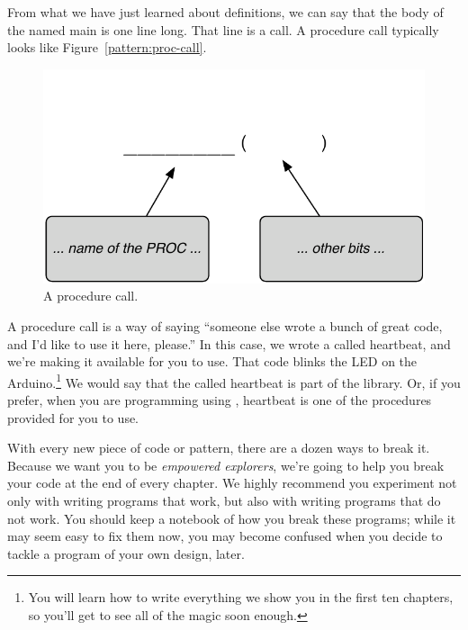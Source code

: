 

From what we have just learned about \PROC definitions, we can say that the body of the \PROC named {\code main} is one line long. That line is a \PROCedure call. A procedure call typically looks like Figure~\vref{pattern:proc-call}.

\begin{figure}[h!]
  \begin{center}
    \includegraphics[width=\linewidth]{images/proc-call-pattern}
    \caption{A procedure call.}
    \label{pattern:proc-call}
  \end{center}
\end{figure}

A procedure call is a way of saying ``someone else wrote a bunch of great code, and I'd like to use it here, please.'' In this case, we wrote a \PROC called {\code heartbeat}, and we're making it available for you to use. That code blinks the LED on the Arduino.\footnote{You will learn how to write everything we show you in the first ten chapters, so you'll get to see all of the magic soon enough.} We would say that the \PROC called {\code heartbeat} is part of the \plumbing library. Or, if you prefer, when you are programming using \plumbing, {\code heartbeat} is one of the procedures provided for you to use.

\BREAKAGE
With every new piece of code or pattern, there are a dozen ways to break it. Because we want you to be {\em empowered explorers}, we're going to help you break your code at the end of every chapter. We highly recommend you experiment not only with writing programs that work, but also with writing programs that {\strong do not} work. You should keep a notebook of how you break these programs; while it may seem easy to fix them now, you may become confused when you decide to tackle a program of your own design, later.

